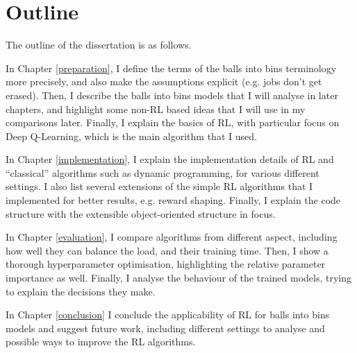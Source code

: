 

\section{Outline}

The outline of the dissertation is as follows.


In Chapter \ref{preparation}, I define the terms of the balls into bins terminology more precisely, and also make the assumptions explicit (e.g. jobs don't get erased). Then, I describe the balls into bins models that I will analyse in later chapters, and highlight some non-RL based ideas that I will use in my comparisons later. Finally, I explain the basics of RL, with particular focus on Deep Q-Learning, which is the main algorithm that I used.


In Chapter \ref{implementation}, I explain the implementation details of RL and ``classical'' algorithms such as dynamic programming, for various different settings. I also list several extensions of the simple RL algorithms that I implemented for better results, e.g. reward shaping. Finally, I explain the code structure with the extensible object-oriented structure in focus.


In Chapter \ref{evaluation}, I compare algorithms from different aspect, including how well they can balance the load, and their training time. Then, I show a thorough hyperparameter optimisation, highlighting the relative parameter importance as well. Finally, I analyse the behaviour of the trained models, trying to explain the decisions they make.


In Chapter \ref{conclusion} I conclude the applicability of RL for balls into bins models and suggest future work, including different settings to analyse and possible ways to improve the RL algorithms.